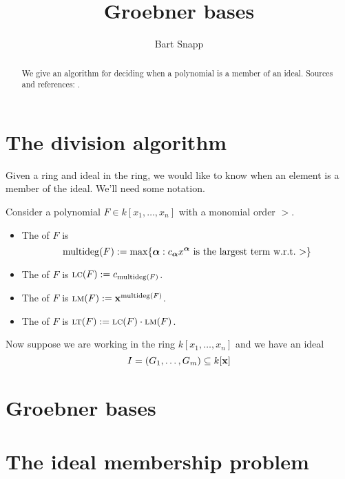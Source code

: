 \documentclass{ximera}
\title{Groebner bases}
\author{Bart Snapp}
\begin{document}
\begin{abstract}
  We give an algorithm for deciding when a polynomial is a member of
  an ideal.  Sources and references: \cite{CLO2007,hS2003}.
\end{abstract}
\maketitle


\section{The division algorithm}

Given a ring and ideal in the ring, we would like to know when an
element is a member of the ideal. We'll need some notation.


\begin{definition}
  Consider a polynomial $F\in k[x_1,\dots, x_n]$ with a monomial order
  $>$.
  \begin{itemize}
    \item The  of $F$ is
    \[
    \operatorname{multideg}(F) := \max\{{\boldsymbol\alpha}: \text{$c_{\boldsymbol\alpha} x^{\boldsymbol\alpha}$ is the largest term w.r.t.\ $>$} \}
    \]
  \item The  of $F$ is $\textsc{lc}(F) := c_{\operatorname{multideg}(F)}$.
  \item The  of $F$ is $\textsc{lm}(F) := \mathbf{x}^{\operatorname{multideg}(F)}$.
  \item The  of $F$ is $\textsc{lt}(F) := \textsc{lc}(F)\cdot \textsc{lm}(F)$.
  \end{itemize}
\end{definition}

Now suppose we are working in the ring $k[x_1,\dots, x_n]$ and we have an ideal
\[
I = (G_1,\dots, G_m) \subseteq k[\mathbf{x}]
\]


\section{Groebner bases}



\section{The ideal membership problem}
\end{document}
